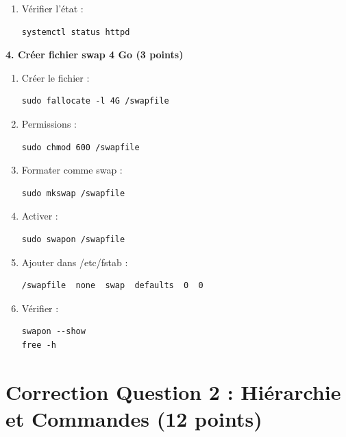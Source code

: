 \documentclass[12pt,a4paper]{article}
\begin{document}
\begin{answerbox}
\begin{enumerate}
    \item Vérifier l'état :
    \begin{lstlisting}
systemctl status httpd
    \end{lstlisting}
\end{enumerate}

\textbf{4. Créer fichier swap 4 Go (3 points)}

\begin{enumerate}
    \item Créer le fichier :
    \begin{lstlisting}
sudo fallocate -l 4G /swapfile
    \end{lstlisting}
    
    \item Permissions :
    \begin{lstlisting}
sudo chmod 600 /swapfile
    \end{lstlisting}
    
    \item Formater comme swap :
    \begin{lstlisting}
sudo mkswap /swapfile
    \end{lstlisting}
    
    \item Activer :
    \begin{lstlisting}
sudo swapon /swapfile
    \end{lstlisting}
    
    \item Ajouter dans /etc/fstab :
    \begin{verbatim}
/swapfile  none  swap  defaults  0  0
    \end{verbatim}
    
    \item Vérifier :
    \begin{lstlisting}
swapon --show
free -h
    \end{lstlisting}
\end{enumerate}
\end{answerbox}

\newpage


\section{Correction Question 2 : Hiérarchie et Commandes (12 points)}
\end{document}
